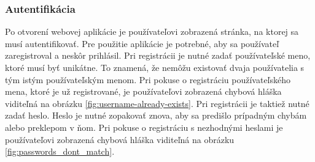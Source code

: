 \subsubsection{Autentifikácia}
\indent \indent Po otvorení webovej aplikácie je používateľovi zobrazená stránka, na ktorej sa musí autentifikovať. Pre použitie aplikácie je potrebné, aby sa používateľ zaregistroval a neskôr prihlásil. Pri registrácii je nutné zadať používateľské meno, ktoré musí byť unikátne. To znamená, že nemôžu existovať dvaja používatelia s tým istým používateľským menom. Pri pokuse o registráciu používateľského mena, ktoré je už registrované, je používateľovi zobrazená chybová hláška viditeľná na obrázku \ref{fig:username-already-exists}. Pri registrácii je taktiež nutné zadať heslo. Heslo je nutné zopakovať znova, aby sa predišlo prípadným chybám alebo preklepom v ňom. Pri pokuse o registráciu s nezhodnými heslami je používateľovi zobrazená chybová hláška viditeľná na obrázku \ref{fig:passwords_dont_match}.

